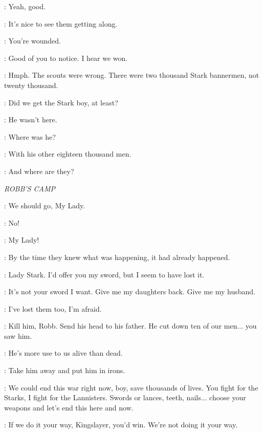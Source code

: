 \BRONN: Yeah, good. 


\TYRION: It's nice to see them getting along. 


\TYWIN: You're wounded. 

\TYRION: Good of you to notice. I hear we won. 

\TYWIN: Hmph. The scouts were wrong. There were two thousand Stark bannermen, not twenty thousand. 

\TYRION: Did we get the Stark boy, at least? 

\TYWIN: He wasn't here. 

\TYRION: Where was he? 

\TYWIN: With his other eighteen thousand men. 

\TYRION: And where are they? 


\scene

\textit{ROBB'S CAMP} 


\RODRIK: We should go, My Lady. 

\CATELYN: No! 

\RODRIK: My Lady! 


\ROBB: By the time they knew what was happening, it had already happened. 

\JAIME: Lady Stark. I'd offer you my sword, but I seem to have lost it. 

\CATELYN: It's not your sword I want. Give me my daughters back. Give me my husband. 

\JAIME: I've lost them too, I'm afraid. 

\THEON: Kill him, Robb. Send his head to his father. He cut down ten of our men$\ldots$ you saw him. 

\ROBB: He's more use to us alive than dead. 

\CATELYN: Take him away and put him in irons. 

\JAIME: We could end this war right now, boy, save thousands of lives. You fight for the Starks, I fight for the Lannisters. Swords or lances, teeth, nails$\ldots$ choose your weapons and let's end this here and now. 

\ROBB: If we do it your way, Kingslayer, you'd win. We're not doing it your way. 

